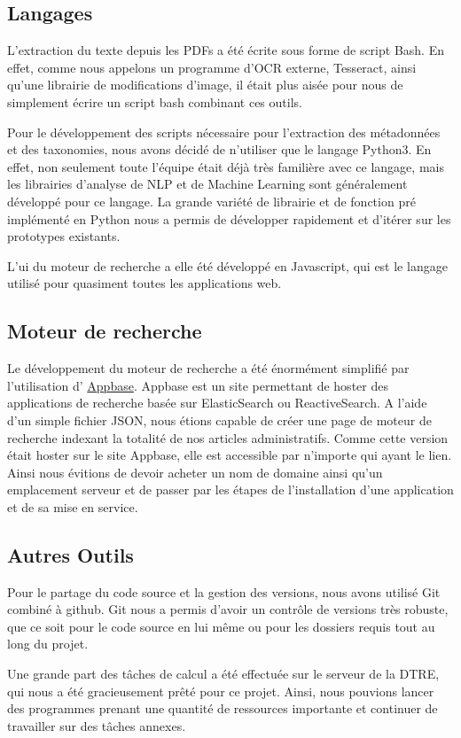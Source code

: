 
\subsection{Langages}
L'extraction du texte depuis les PDFs a été écrite sous forme de script Bash. En effet, comme nous appelons un programme d'\gls{OCR} externe, Tesseract, ainsi qu'une librairie de modifications d'image, il était plus aisée pour nous de simplement écrire un script bash combinant ces outils.

Pour le développement des scripts nécessaire pour l'extraction des métadonnées et des taxonomies, nous avons décidé de n'utiliser que le langage Python3. En effet, non seulement toute l'équipe était déjà très familière avec ce langage, mais les librairies d'analyse de \gls{NLP} et de Machine Learning sont généralement développé pour ce langage. La grande variété de librairie et de fonction pré implémenté en Python nous a permis de développer rapidement et d'itérer sur les prototypes existants. 

L'\gls{ui} du moteur de recherche a elle été développé en Javascript, qui est le langage utilisé pour quasiment toutes les applications web. 

\subsection{Moteur de recherche}
Le développement du moteur de recherche a été énormément simplifié par l'utilisation d' \href{https://appbase.io}{Appbase}. Appbase est un site permettant de hoster des applications de recherche basée sur ElasticSearch ou ReactiveSearch. A l'aide d'un simple fichier JSON, nous étions capable de créer une page de moteur de recherche indexant la totalité de nos articles administratifs. Comme cette version était hoster sur le site Appbase, elle est accessible par n'importe qui ayant le lien. Ainsi nous évitions de devoir acheter un nom de domaine ainsi qu'un emplacement serveur et de passer par les étapes de l'installation d'une application et de sa mise en service. 

\subsection{Autres Outils}
Pour le partage du code source et la gestion des versions, nous avons utilisé Git combiné à github. Git nous a permis d'avoir un contrôle de versions très robuste, que ce soit pour le code source en lui même ou pour les dossiers requis tout au long du projet. 

Une grande part des tâches de calcul a été effectuée sur le serveur de la DTRE, qui nous a été gracieusement prêté pour ce projet. Ainsi, nous pouvions lancer des programmes prenant une quantité de ressources importante et continuer de travailler sur des tâches annexes.




